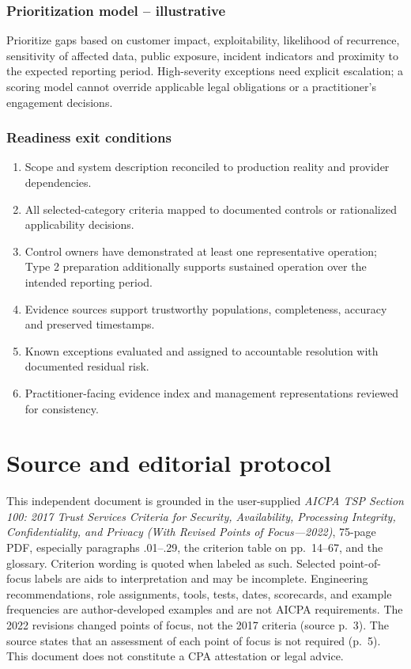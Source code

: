 \documentclass[10pt,oneside]{report}
\begin{document}
\subsection{Prioritization model -- illustrative}
Prioritize gaps based on customer impact, exploitability, likelihood of recurrence, sensitivity of affected data, public exposure, incident indicators and proximity to the expected reporting period. High-severity exceptions need explicit escalation; a scoring model cannot override applicable legal obligations or a practitioner's engagement decisions.

\subsection{Readiness exit conditions}
\begin{enumerate}
\item Scope and system description reconciled to production reality and provider dependencies.
\item All selected-category criteria mapped to documented controls or rationalized applicability decisions.
\item Control owners have demonstrated at least one representative operation; Type 2 preparation additionally supports sustained operation over the intended reporting period.
\item Evidence sources support trustworthy populations, completeness, accuracy and preserved timestamps.
\item Known exceptions evaluated and assigned to accountable resolution with documented residual risk.
\item Practitioner-facing evidence index and management representations reviewed for consistency.
\end{enumerate}


\chapter*{Source and editorial protocol}
This independent document is grounded in the user-supplied \emph{AICPA TSP Section 100: 2017 Trust Services Criteria for Security, Availability, Processing Integrity, Confidentiality, and Privacy (With Revised Points of Focus---2022)}, 75-page PDF, especially paragraphs .01--.29, the criterion table on pp.~14--67, and the glossary. Criterion wording is quoted when labeled as such. Selected point-of-focus labels are aids to interpretation and may be incomplete. Engineering recommendations, role assignments, tools, tests, dates, scorecards, and example frequencies are author-developed examples and are not AICPA requirements. The 2022 revisions changed points of focus, not the 2017 criteria (source p.~3). The source states that an assessment of each point of focus is not required (p.~5). This document does not constitute a CPA attestation or legal advice.
\end{document}
